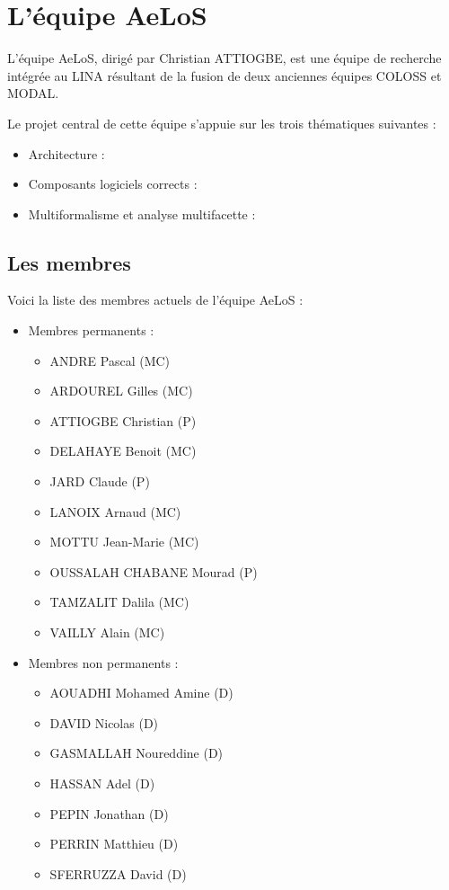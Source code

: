 \documentclass[12pt,a4paper]{report}
\begin{document}
\chapter{L'équipe AeLoS}	

L'équipe AeLoS, dirigé par Christian ATTIOGBE, est une équipe de recherche intégrée au LINA résultant de la fusion de deux anciennes équipes COLOSS et MODAL.

Le projet central de cette équipe s'appuie sur les trois thématiques suivantes :
\begin{itemize}[label=$\circ$]
  \item Architecture : 
  \item Composants logiciels corrects : 
  \item Multiformalisme et analyse multifacette : 
\end{itemize}

\section{Les membres}
Voici la liste des membres actuels de l'équipe AeLoS : \\
\begin{itemize}
  \item Membres permanents :\\
  \begin{itemize}[label=$\circ$]
    \item ANDRE Pascal (MC)
    \item ARDOUREL Gilles (MC)
    \item ATTIOGBE Christian (P)
    \item DELAHAYE Benoit (MC)
    \item JARD Claude (P)
    \item LANOIX Arnaud (MC)
    \item MOTTU Jean-Marie (MC)
    \item OUSSALAH CHABANE Mourad (P)
    \item TAMZALIT Dalila (MC)
    \item VAILLY Alain (MC)\\
  \end{itemize}
  
  \item Membres non permanents :\\
  \begin{itemize}[label=$\circ$]
    \item AOUADHI Mohamed Amine (D)
    \item DAVID Nicolas (D)
    \item GASMALLAH Noureddine (D)
    \item HASSAN Adel (D)
    \item PEPIN Jonathan (D)
    \item PERRIN Matthieu (D)
    \item SFERRUZZA David (D)\\
  \end{itemize} 
\end{itemize}
\end{document}
